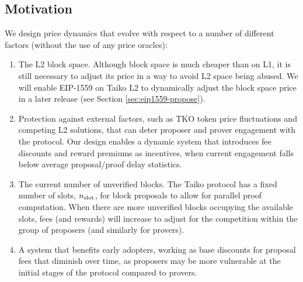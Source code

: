 \subsection{Motivation}
We design price dynamics that evolve with respect to a number of different factors (without the use of any price oracles):
\begin{enumerate}
\item The L2 block space. Although block space is much cheaper than on L1, it is still necessary to adjust its price in a way to avoid L2 space being abused. We will enable EIP-1559 on Taiko L2 to dynamically adjust the block space price in a later release (see Section \ref{sec:eip1559-propose}).
\item Protection against external factors, such as TKO token price fluctuations and competing L2 solutions, that can deter proposer and prover engagement with the protocol. Our design enables a dynamic system that introduces fee discounts and reward premiums as incentives, when current engagement falls below average proposal/proof delay statistics.

\item The current number of unverified blocks. The Taiko protocol has a fixed number of slots, $n_\textnormal{slot}$, for block proposals to allow for parallel proof computation. When there are more unverified blocks occupying the available slots, fees (and rewards) will increase to adjust for the competition within the group of proposers (and similarly for provers).

\item A system that benefits early adopters, working as base discounts for proposal fees that diminish over time, as proposers may be more vulnerable at the initial stages of the protocol compared to provers.
\end{enumerate}


